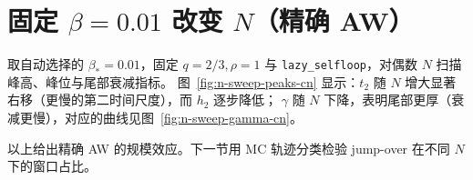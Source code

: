 \section{固定 \texorpdfstring{$\beta=0.01$}{beta=0.01} 改变 \texorpdfstring{$N$}{N}（精确 AW）}
取自动选择的 $\beta_\ast=0.01$，固定 $q=2/3,\rho=1$ 与 \texttt{lazy\_selfloop}，对偶数 $N$ 扫描峰高、峰位与尾部衰减指标。
图~\ref{fig:n-sweep-peaks-cn} 显示：$t_2$ 随 $N$ 增大显著右移（更慢的第二时间尺度），而 $h_2$ 逐步降低；
$\gamma$ 随 $N$ 下降，表明尾部更厚（衰减更慢），对应的曲线见图~\ref{fig:n-sweep-gamma-cn}。

以上给出精确 AW 的规模效应。下一节用 MC 轨迹分类检验 jump-over 在不同 $N$ 下的窗口占比。
